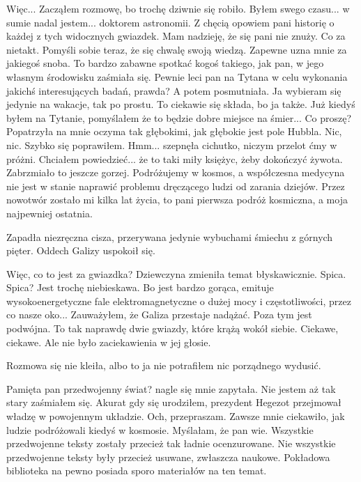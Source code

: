 \begin{dialogue}
	\ds{} Więc... \dm{} Zacząłem rozmowę, bo trochę dziwnie się robiło. \dm{} Byłem swego czasu... w sumie nadal jestem... doktorem astronomii.
		Z chęcią opowiem pani historię o każdej z tych widocznych gwiazdek. Mam nadzieję, że się pani nie znuży. \dm{} Co za nietakt. Pomyśli sobie teraz, że się chwalę swoją wiedzą.
		Zapewne uzna mnie za jakiegoś snoba.
	\ds{} To bardzo zabawne spotkać kogoś takiego, jak pan, w jego własnym środowisku \dm{} zaśmiała się. \dm{}
		 Pewnie leci pan na Tytana w celu wykonania jakichś interesujących badań, prawda? \dm{} A potem posmutniała. \dm{} Ja wybieram się jedynie na wakacje, tak po prostu.
	\ds{} To ciekawie się składa, bo ja także. Już kiedyś byłem na Tytanie, pomyślałem że to będzie dobre miejsce na śmier...
	\ds{} Co proszę? \dm{} Popatrzyła na mnie oczyma tak głębokimi, jak głębokie jest pole Hubbla.
	\ds{} Nic, nic. \dm{} Szybko się poprawiłem.
	\ds{} Hmm... \dm{} szepnęła cichutko, niczym przelot ćmy w próżni.
	\ds{} Chciałem powiedzieć... że to taki miły księżyc, żeby dokończyć żywota. \dm{} Zabrzmiało to jeszcze gorzej. 
		\dm{} Podróżujemy w kosmos, a współczesna medycyna nie jest w stanie naprawić problemu dręczącego ludzi od zarania dziejów. 
		Przez nowotwór zostało mi kilka lat życia, to pani pierwsza podróż kosmiczna, a moja najpewniej ostatnia.
\end{dialogue}

Zapadła niezręczna cisza, przerywana jedynie wybuchami śmiechu z górnych pięter.
Oddech Galizy uspokoił się.

\begin{dialogue}
	\ds{} Więc, co to jest za gwiazdka? \dm{} Dziewczyna zmieniła temat błyskawicznie. 
	\ds{} Spica. 
	\ds{} Spica? Jest trochę niebieskawa.
	\ds{} Bo jest bardzo gorąca, emituje wysokoenergetyczne fale elektromagnetyczne o dużej mocy i częstotliwości, przez co nasze oko... \dm{} Zauważyłem, że Galiza przestaje nadążać.
		\dm{} Poza tym jest podwójna. To tak naprawdę dwie gwiazdy, które krążą wokół siebie.
	\ds{} Ciekawe, ciekawe. \dm{} Ale nie było zaciekawienia w jej głosie.
\end{dialogue}

Rozmowa się nie kleiła, albo to ja nie potrafiłem nic porządnego wydusić.

\begin{dialogue}
	\ds{} Pamięta pan przedwojenny świat? \dm{} nagle się mnie zapytała. 
	\ds{} Nie jestem aż tak stary \dm{} zaśmiałem się. \dm{} Akurat gdy się urodziłem, prezydent Hegezot przejmował władzę w powojennym układzie.
	\ds{} Och, przepraszam. Zawsze mnie ciekawiło, jak ludzie podróżowali kiedyś w kosmosie. Myślałam, że pan wie. Wszystkie przedwojenne teksty zostały przecież tak ładnie ocenzurowane.
	\ds{} Nie wszystkie przedwojenne teksty były przecież usuwane, zwłaszcza naukowe. Pokładowa biblioteka na pewno posiada sporo materiałów na ten temat.
\end{dialogue}

